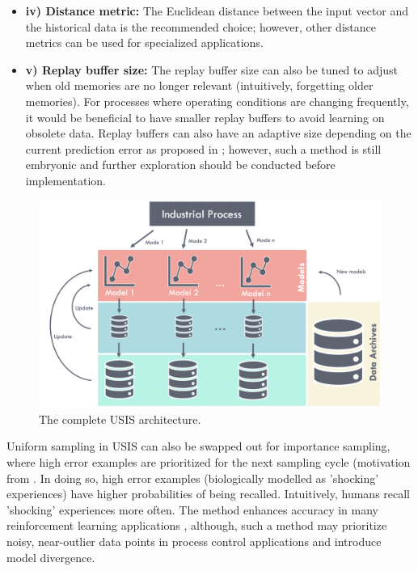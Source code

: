 \begin{itemize}
    \item \textbf{iv) Distance metric: } The Euclidean distance between the input vector and the historical data is the recommended choice; however, other distance metrics can be used for specialized applications.
    
    
    \item \textbf{v) Replay buffer size: } The replay buffer size can also be tuned to adjust when old memories are no longer relevant (intuitively, forgetting older memories).  For processes where operating conditions are changing frequently, it would be beneficial to have smaller replay buffers to avoid learning on obsolete data.  Replay buffers can also have an adaptive size depending on the current prediction error as proposed in \cite{eff_of_er}; however, such a method is still embryonic and further exploration should be conducted before implementation.
\end{itemize}

\begin{figure}[h]
    \centering
    \includegraphics[width=\textwidth]{images/ch2/02USIS_Complete.jpeg}
    \caption{The complete USIS architecture.}
    \label{fig:02USIS_Complete}
\end{figure}

Uniform sampling in USIS can also be swapped out for importance sampling, where high error examples are prioritized for the next sampling cycle (motivation from \cite{prioritize_exp_replay}. In doing so, high error examples (biologically modelled as 'shocking' experiences) have higher probabilities of being recalled.  Intuitively, humans recall 'shocking' experiences more often. The method enhances accuracy in many reinforcement learning applications \cite{dqn, er1, er2}, although, such a method may prioritize noisy, near-outlier data points in process control applications and introduce model divergence.

